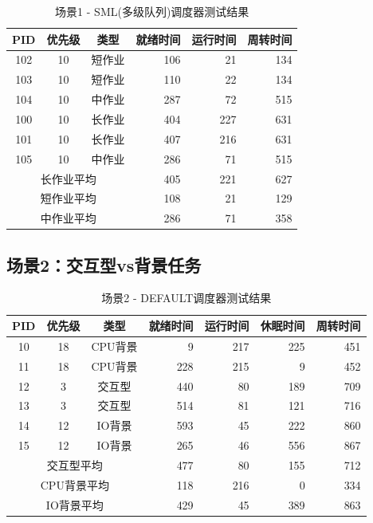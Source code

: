 \documentclass[a4paper, 12pt]{article}
\begin{document}
\begin{table}[H]
	\centering
	\caption{场景1 - SML(多级队列)调度器测试结果}
	\begin{tabular}{cccrrr}
		\toprule
		\textbf{PID} & \textbf{优先级} & \textbf{类型} & \textbf{就绪时间} & \textbf{运行时间} & \textbf{周转时间} \\
		\midrule
		102 & 10 & 短作业 & 106 & 21 & 134 \\
		103 & 10 & 短作业 & 110 & 22 & 134 \\
		104 & 10 & 中作业 & 287 & 72 & 515 \\
		100 & 10 & 长作业 & 404 & 227 & 631 \\
		101 & 10 & 长作业 & 407 & 216 & 631 \\
		105 & 10 & 中作业 & 286 & 71 & 515 \\
		\midrule
		\multicolumn{3}{c}{长作业平均} & 405 & 221 & 627 \\
		\multicolumn{3}{c}{短作业平均} & 108 & 21 & 129 \\
		\multicolumn{3}{c}{中作业平均} & 286 & 71 & 358 \\
		\bottomrule
	\end{tabular}
\end{table}

\subsection{场景2：交互型vs背景任务}

\begin{table}[H]
	\centering
	\caption{场景2 - DEFAULT调度器测试结果}
	\begin{tabular}{cccrrrr}
		\toprule
		\textbf{PID} & \textbf{优先级} & \textbf{类型} & \textbf{就绪时间} & \textbf{运行时间} & \textbf{休眠时间} & \textbf{周转时间} \\
		\midrule
		10 & 18 & CPU背景 & 9 & 217 & 225 & 451 \\
		11 & 18 & CPU背景 & 228 & 215 & 9 & 452 \\
		12 & 3 & 交互型 & 440 & 80 & 189 & 709 \\
		13 & 3 & 交互型 & 514 & 81 & 121 & 716 \\
		14 & 12 & IO背景 & 593 & 45 & 222 & 860 \\
		15 & 12 & IO背景 & 265 & 46 & 556 & 867 \\
		\midrule
		\multicolumn{3}{c}{交互型平均} & 477 & 80 & 155 & 712 \\
		\multicolumn{3}{c}{CPU背景平均} & 118 & 216 & 0 & 334 \\
		\multicolumn{3}{c}{IO背景平均} & 429 & 45 & 389 & 863 \\
		\bottomrule
	\end{tabular}
\end{table}
\end{document}
